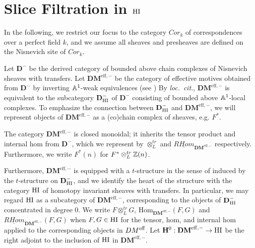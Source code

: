 




\newcommand{\D}{\mathbf{D}}
\newcommand{\DMm}{\mathbf{DM}^{\mathrm{eff},-}}
\newcommand{\Gm}{\mathbb{A}^1 \setminus \{0\}}
\newcommand{\tDM}{\otimes_{L}^{tr}}
\newcommand{\homDM}{\mathrm{Hom}_{\DMm}}
\newcommand{\rhomDM}{\underline{RHom}_{\DMm}}
\newcommand{\rhom}{\underline{RHom}_{\D^-}}
\renewcommand{\H}{\mathbf{H}}
\newcommand{\tHI}{\otimes^{\mathrm{Htr}}}
\newcommand{\homHI}{\mathrm{Hom}_{\HI}}
\newcommand{\ihomHI}{\underline{Hom}_{\HI}}
\newcommand{\Ox}{\mathcal{O}^{\times}}
\newcommand{\slice}[1]{\nu^{#1}}
\newcommand{\anis}{a_{\mathrm{Nis}}}
\newcommand{\sliceHI}{\sigma}
\newcommand{\SliceHI}{\Sigma}

\section{Slice Filtration in $\mathrm{HI}$}

\noindent In the following, we restrict our focus to the category 
$Cor_k$ of correspondences over a perfect field $k$, and we assume 
all sheaves and presheaves are defined on the Nisnevich site of 
$Cor_k$.

Let $\D^-$ be the derived category of bounded above chain 
complexes of Nisnevich sheaves with transfers. Let $\DMm$ be
the category of effective motives obtained from $\D^-$ by 
inverting $\mathbb{A}^1$-weak equivalences (see \cite{MVW}) By \emph{loc.\ cit.}, $\DMm$ is 
equivalent to the subcategory $\D_{\HI}^-$ of $\D^-$ consisting of 
bounded above $\mathbb{A}^1$-local complexes. To emphasize the connection
between $\D_{\HI}^-$ and $\DMm$, we will represent objects of
$\DMm$ as a (co)chain complex of sheaves, e.g. $F^*$.

The category $\DMm$ is closed monoidal; it inherits the tensor
product and internal hom from $\D^-$, which we represent by
$\tDM$ and $\rhomDM$ respectively. Furthermore, we write $F^*(n)$ for
$F^* \tDM \Z(n)$.

Furthermore, $\DMm$ is equipped with a $t$-structure in the sense 
of \cite{BBD} induced by the $t$-structure on $\D_{\HI}^-$, and 
we identify the heart of the structure with the category $\mathrm{HI}$ of 
homotopy invariant sheaves with transfers. In particular, we may 
regard $\mathrm{HI}$ as a subcategory of $\DMm$, corresponding to the 
objects of $\D_{\HI}^-$ concentrated in degree 0. We write $F 
\tDM G$, $\homDM(F, G)$ and $\rhomDM(F, G)$ when $F, G \in \mathrm{HI}$ 
for the tensor, hom, and internal hom applied to the 
corresponding objects in $DM^{\mathrm{eff}}$. Let $\H^0 : \DMm \rightarrow \HI$ 
be the right adjoint to the inclusion of $\mathrm{HI}$ in $\DMm$.

